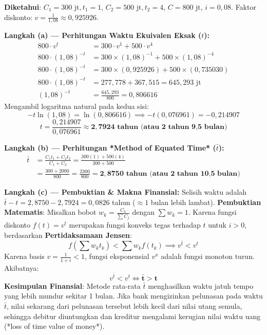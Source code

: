 \documentclass[11pt,a4paper]{article}
\begin{document}
\begin{solusibox}
\textbf{Diketahui}: $C_1 = 300\text{ jt}, t_1 = 1$, $C_2 = 500\text{ jt}, t_2 = 4$, $C = 800\text{ jt}$, $i = 0{,}08$.  
Faktor diskonto: $v = \frac{1}{1{,}08} \approx 0{,}925926$.

\textbf{Langkah (a) --- Perhitungan Waktu Ekuivalen Eksak ($t$):}
\begin{align*}
    800 \cdot v^t &= 300 \cdot v^1 + 500 \cdot v^4 \\
    800 \cdot (1{,}08)^{-t} &= 300 \times (1{,}08)^{-1} + 500 \times (1{,}08)^{-4} \\
    800 \cdot (1{,}08)^{-t} &= 300 \times (0{,}925926) + 500 \times (0{,}735030) \\
    800 \cdot (1{,}08)^{-t} &= 277{,}778 + 367{,}515 = 645{,}293\text{ jt} \\
    (1{,}08)^{-t} &= \frac{645{,}293}{800} = 0{,}806616
\end{align*}
Mengambil logaritma natural pada kedua sisi:
$$-t \ln(1{,}08) = \ln(0{,}806616) \implies -t (0{,}076961) = -0{,}214907$$
$$t = \frac{0{,}214907}{0{,}076961} \approx \mathbf{2{,}7924 \text{ tahun (atau 2 tahun 9,5 bulan)}}$$

\textbf{Langkah (b) --- Perhitungan *Method of Equated Time* ($\bar{t}$):}
\begin{align*}
    \bar{t} &= \frac{C_1 t_1 + C_2 t_2}{C_1 + C_2} = \frac{300(1) + 500(4)}{300 + 500} \\
    &= \frac{300 + 2000}{800} = \frac{2300}{800} = \mathbf{2{,}8750 \text{ tahun (atau 2 tahun 10,5 bulan)}}
\end{align*}

\textbf{Langkah (c) --- Pembuktian \& Makna Finansial:}
Selisih waktu adalah $\bar{t} - t = 2{,}8750 - 2{,}7924 = 0{,}0826$ tahun ($\approx 1$ bulan lebih lambat).  
\textbf{Pembuktian Matematis}: Misalkan bobot $w_k = \frac{C_k}{\sum C_j}$ dengan $\sum w_k = 1$. Karena fungsi diskonto $f(t) = v^t$ merupakan fungsi konveks tegas terhadap $t$ untuk $i > 0$, berdasarkan \textbf{Pertidaksamaan Jensen}:
$$f\left(\sum w_k t_k\right) < \sum w_k f(t_k) \implies v^{\bar{t}} < v^t$$
Karena basis $v = \frac{1}{1+i} < 1$, fungsi eksponensial $v^x$ adalah fungsi monoton turun. Akibatnya:
$$v^{\bar{t}} < v^t \iff \mathbf{\bar{t} > t}$$
\textbf{Kesimpulan Finansial}: Metode rata-rata $\bar{t}$ menghasilkan waktu jatuh tempo yang lebih mundur sekitar 1 bulan. Jika bank mengizinkan pelunasan pada waktu $\bar{t}$, nilai sekarang dari pelunasan tersebut lebih kecil dari nilai utang semula, sehingga debitur diuntungkan dan kreditur mengalami kerugian nilai waktu uang (*loss of time value of money*).
\end{solusibox}
\end{document}
